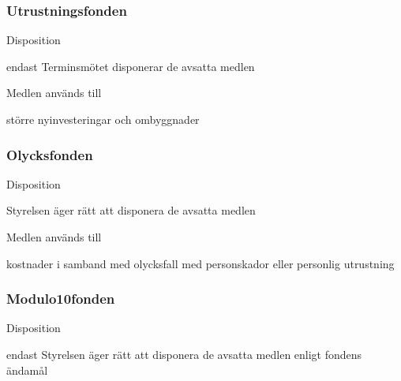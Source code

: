\documentclass[10pt]{article}
\begin{document}
\subsubsection{Utrustningsfonden}
\begin{emptylist}
\item Disposition
    \begin{dashlist}
    \item endast Terminsmötet disponerar de avsatta medlen
    \end{dashlist}
\end{emptylist}
\begin{emptylist}
\item Medlen används till
    \begin{dashlist}
    \item större nyinvesteringar och ombyggnader
    \end{dashlist}
\end{emptylist}

\subsubsection{Olycksfonden}
\begin{emptylist}
\item Disposition
    \begin{dashlist}
    \item Styrelsen äger rätt att disponera de avsatta medlen
    \end{dashlist}
\end{emptylist}
\begin{emptylist}
\item Medlen används till
    \begin{dashlist}
    \item kostnader i samband med olycksfall med personskador eller personlig
        utrustning
    \end{dashlist}
\end{emptylist}

\subsubsection{Modulo10fonden}
\begin{emptylist}
\item Disposition
    \begin{dashlist}
    \item endast Styrelsen äger rätt att disponera de avsatta medlen enligt
        fondens ändamål
    \end{dashlist}
\end{emptylist}
\end{document}
